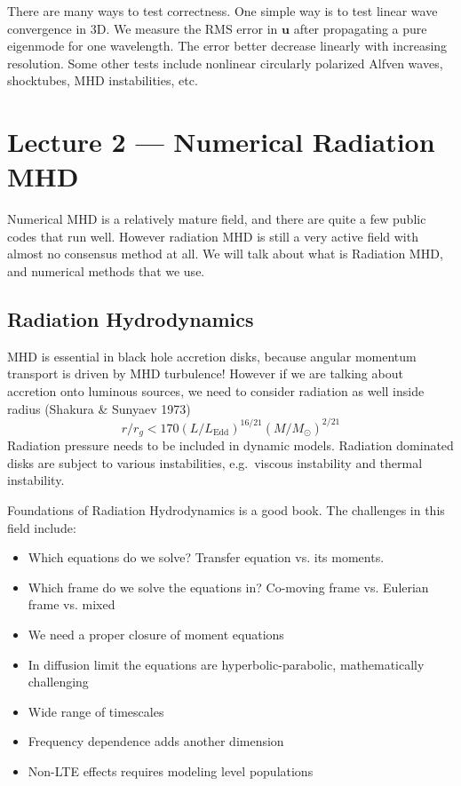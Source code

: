 \documentclass[letterpaper, 11pt]{article}
\numberwithin{equation}{section}
\numberwithin{figure}{section}
\begin{document}
There are many ways to test correctness. One simple way is to test linear wave
convergence in 3D. We measure the RMS error in $\mathbf{u}$ after propagating
a pure eigenmode for one wavelength. The error better decrease linearly with
increasing resolution. Some other tests include nonlinear circularly polarized
Alfven waves, shocktubes, MHD instabilities, etc.

\section{Lecture 2 --- Numerical Radiation MHD}

Numerical MHD is a relatively mature field, and there are quite a few public
codes that run well. However radiation MHD is still a very active field with
almost no consensus method at all. We will talk about what is Radiation MHD, and
numerical methods that we use.

\subsection{Radiation Hydrodynamics}

MHD is essential in black hole accretion disks, because angular momentum
transport is driven by MHD turbulence! However if we are talking about accretion
onto luminous sources, we need to consider radiation as well inside radius
(Shakura \& Sunyaev 1973)
\begin{equation}
  \label{eq:4}
  r/r_{g} < 170(L/L_\mathrm{Edd})^{16/21}(M/M_{\odot})^{2/21}
\end{equation}
Radiation pressure needs to be included in dynamic models. Radiation dominated
disks are subject to various instabilities, e.g.\ viscous instability and
thermal instability.

Foundations of Radiation Hydrodynamics is a good book. The challenges in this
field include:
\begin{itemize}
\item Which equations do we solve? Transfer equation vs. its moments.
    \item Which frame do we solve the equations in? Co-moving frame vs. Eulerian
      frame vs. mixed
    \item We need a proper closure of moment equations
    \item In diffusion limit the equations are hyperbolic-parabolic,
      mathematically challenging
    \item Wide range of timescales
    \item Frequency dependence adds another dimension
    \item Non-LTE effects requires modeling level populations
\end{itemize}
\end{document}
